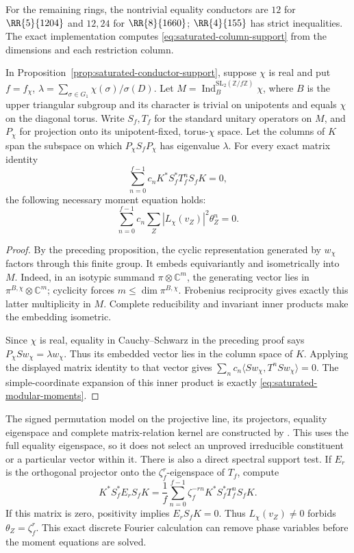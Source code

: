 For the remaining rings, the nontrivial equality conductors are
$12$ for $\RR{5}{1204}$ and $12,24$ for $\RR{8}{1660}$;
$\RR{4}{155}$ has strict inequalities. The exact implementation
computes \eqref{eq:saturated-column-support} from the dimensions
and each restriction column.

\begin{proposition}
\label{prop:saturated-modular-moments}
In Proposition~\ref{prop:saturated-conductor-support}, suppose $\chi$
is real and put $f=f_\chi$,
$\lambda=\sum_{\sigma\in G_1}\chi(\sigma)/\sigma(D)$.
Let $M=\operatorname{Ind}_{B}^{\mathrm{SL}_2(\mathbb Z/f\mathbb Z)}\chi$,
where $B$ is the upper triangular subgroup and its character is trivial
on unipotents and equals $\chi$ on the diagonal torus. Write $S_f,T_f$
for the standard unitary operators on $M$, and $P_\chi$ for projection
onto its unipotent-fixed, torus-$\chi$ space. Let the columns of $K$
span the subspace on which $P_\chi S_fP_\chi$ has eigenvalue $\lambda$.
For every exact matrix identity
\[
 \sum_{n=0}^{f-1}c_n K^*S_f^*T_f^nS_fK=0,
\]
the following necessary moment equation holds:
\begin{equation}\label{eq:saturated-modular-moments}
 \sum_{n=0}^{f-1}c_n\sum_Z|L_\chi(v_Z)|^2\theta_Z^n=0.
\end{equation}
\end{proposition}
\begin{proof}
By the preceding proposition, the cyclic representation generated by
$w_\chi$ factors through this finite group. It embeds equivariantly and
isometrically into $M$. Indeed, in an isotypic summand
$\pi\otimes\mathbb C^m$, the generating vector lies in
$\pi^{B,\chi}\otimes\mathbb C^m$; cyclicity forces
$m\le\dim\pi^{B,\chi}$. Frobenius reciprocity gives exactly this latter
multiplicity in $M$. Complete reducibility and invariant inner products
make the embedding isometric.

Since $\chi$ is real, equality in Cauchy--Schwarz in the preceding
proof says $P_\chi Sw_\chi=\lambda w_\chi$. Thus its embedded vector
lies in the column space of $K$. Applying the displayed matrix identity
to that vector gives
$\sum_n c_n\langle Sw_\chi,T^nSw_\chi\rangle=0$.
The simple-coordinate expansion of this inner product is exactly
\eqref{eq:saturated-modular-moments}.
\end{proof}
The signed permutation model on the projective line, its projectors,
equality eigenspace and complete matrix-relation kernel are constructed
by .
This uses the full equality eigenspace, so it does not select an
unproved irreducible constituent or a particular vector within it.
There is also a direct spectral support test. If $E_r$ is the orthogonal
projector onto the $\zeta_f^r$-eigenspace of $T_f$, compute
\[
 K^*S_f^*E_rS_fK=
 \frac1f\sum_{n=0}^{f-1}\zeta_f^{-rn}K^*S_f^*T_f^nS_fK.
\]
If this matrix is zero, positivity implies $E_rS_fK=0$.
Thus $L_\chi(v_Z)\ne0$ forbids $\theta_Z=\zeta_f^r$.
This exact discrete Fourier calculation can remove phase variables
before the moment equations are solved.


